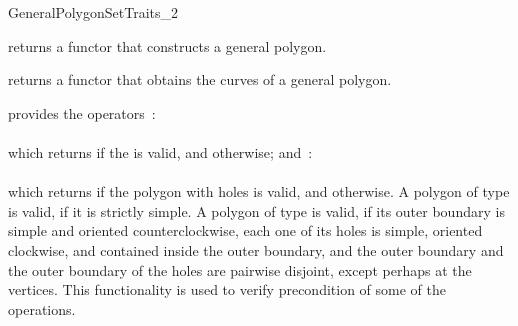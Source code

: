 \begin{ccRefConcept}{GeneralPolygonSetTraits_2}

{returns a functor that constructs a general polygon.}

{returns a functor that obtains the curves of a general polygon.}

{provides the operators~: \\
  \\
 which returns  if the  is valid, and 
 otherwise; and~: \\
  \\
 which returns  if the polygon with holes  
 is valid, and  otherwise.
 A polygon of type  is valid, if it is strictly simple.
 A polygon of type  is valid, 
 if its outer boundary is simple and oriented counterclockwise, each one of 
 its holes is simple, oriented clockwise, and contained inside the outer 
 boundary, and the outer boundary and the outer boundary of the holes are 
 pairwise disjoint, except perhaps at the vertices. This functionality is 
 used to verify precondition of some of the operations.}

\ccHasModels
\\
\\

\ccSeeAlso
\ccSeeAlso

\end{ccRefConcept}

\ccRefPageEnd
